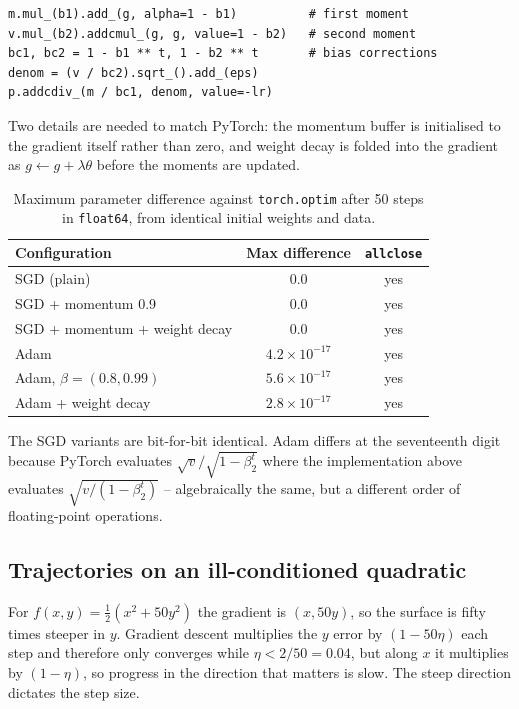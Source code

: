 \documentclass[11pt,a4paper]{article}
\begin{document}
\begin{lstlisting}[caption={Adam's update, with bias correction.}]
m.mul_(b1).add_(g, alpha=1 - b1)          # first moment
v.mul_(b2).addcmul_(g, g, value=1 - b2)   # second moment
bc1, bc2 = 1 - b1 ** t, 1 - b2 ** t       # bias corrections
denom = (v / bc2).sqrt_().add_(eps)
p.addcdiv_(m / bc1, denom, value=-lr)
\end{lstlisting}

Two details are needed to match PyTorch: the momentum buffer is initialised to
the gradient itself rather than zero, and weight decay is folded into the
gradient as $g \leftarrow g + \lambda\theta$ before the moments are updated.

\begin{table}[H]
\centering\small
\caption{Maximum parameter difference against \texttt{torch.optim} after 50
steps in \texttt{float64}, from identical initial weights and data.}
\begin{tabular}{lcc}
\toprule
Configuration & Max difference & \texttt{allclose} \\
\midrule
SGD (plain)                     & $0.0$               & yes \\
SGD + momentum 0.9              & $0.0$               & yes \\
SGD + momentum + weight decay    & $0.0$               & yes \\
Adam                            & $4.2\times10^{-17}$ & yes \\
Adam, $\beta = (0.8, 0.99)$      & $5.6\times10^{-17}$ & yes \\
Adam + weight decay             & $2.8\times10^{-17}$ & yes \\
\bottomrule
\end{tabular}
\end{table}

The SGD variants are bit-for-bit identical. Adam differs at the seventeenth
digit because PyTorch evaluates $\sqrt{v}/\sqrt{1-\beta_2^t}$ where the
implementation above evaluates $\sqrt{v/(1-\beta_2^t)}$ -- algebraically the
same, but a different order of floating-point operations.

\subsection{Trajectories on an ill-conditioned quadratic}

For $f(x,y) = \tfrac12(x^2 + 50y^2)$ the gradient is $(x, 50y)$, so the surface
is fifty times steeper in $y$. Gradient descent multiplies the $y$ error by
$(1-50\eta)$ each step and therefore only converges while $\eta < 2/50 = 0.04$,
but along $x$ it multiplies by $(1-\eta)$, so progress in the direction that
matters is slow. The steep direction dictates the step size.
\end{document}
